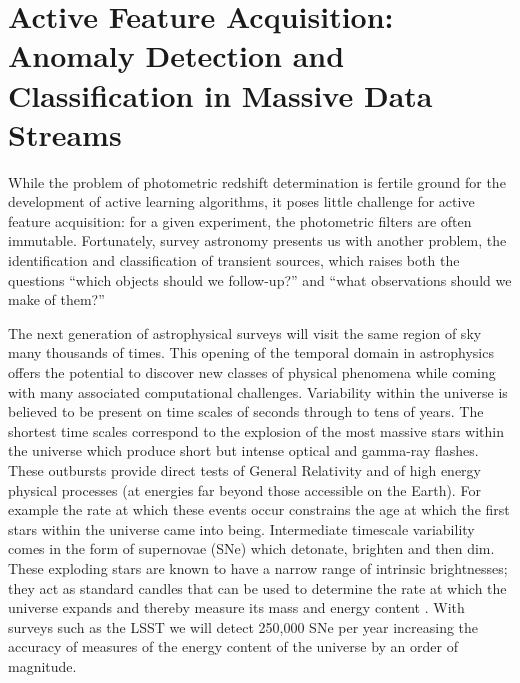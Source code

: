 \documentclass[useAMS,usenatbib,tightenlines,11pt,preprint]{aastex}
\begin{document}
\section{Active Feature Acquisition:
Anomaly Detection and Classification in Massive Data
 Streams}


While the problem of photometric redshift determination is fertile ground for
the development of active learning algorithms, it poses little challenge for
active feature acquisition: for a given experiment, the photometric filters are
often immutable.  Fortunately, survey astronomy presents us with another 
problem, the identification and classification of transient sources,
which raises both the questions ``which objects should we
follow-up?'' and ``what observations should we make of them?''

The next generation of astrophysical surveys will visit the same
region of sky many thousands of times. This opening of the temporal
domain in astrophysics offers the potential to discover new classes of
physical phenomena while coming with many associated computational
challenges. Variability within the universe is believed to be present
on time scales of seconds through to tens of years. The shortest time
scales correspond to the explosion of the most massive stars within
the universe which produce short but intense optical and gamma-ray
flashes. These outbursts provide direct tests of General Relativity
and of high energy physical processes (at energies far beyond those
accessible on the Earth). For example the rate at which these events
occur constrains the age at which the first stars within the universe
came into being. Intermediate timescale variability comes in the form
of supernovae (SNe) which detonate, brighten and then dim. These
exploding stars are known to have a narrow range of intrinsic
brightnesses; they act as standard candles that can be used to
determine the rate at which the universe expands and thereby measure
its mass and energy content \cite{perlmutter99}. 
With surveys such as the LSST we will detect 250,000 SNe per year
increasing the accuracy of measures of the energy content of the
universe by an order of magnitude.
\end{document}
